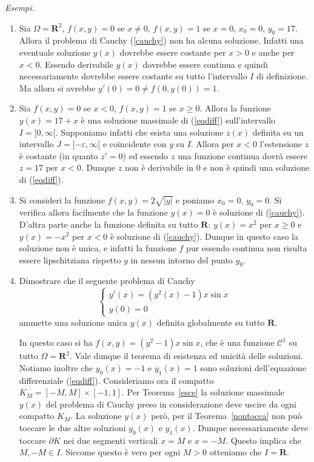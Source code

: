 \documentclass[italian,a4paper]{article}
\newcommand{\R}{\mathbf{R}}
\newcommand{\CC}{\mathcal{C}}
\renewcommand{\epsilon}{\varepsilon}
\begin{document}
\medskip\noindent
\emph{Esempi.}
\begin{enumerate}
\item
Sia $\Omega=\R^2$, $f(x,y)=0$ se $x\neq 0$, $f(x,y)=1$ se $x=0$,
$x_0=0$, $y_0=17$. Allora
il problema di
Cauchy (\ref{cauchy}) non ha alcuna soluzione. Infatti
una eventuale soluzione $y(x)$ dovrebbe essere costante per $x>0$ e
anche per $x<0$. Essendo derivabile $y(x)$ dovrebbe essere continua e
quindi necessariamente dovrebbe essere costante su tutto l'intervallo $I$ di
definizione.  Ma allora si avrebbe $y'(0)=0 \neq f(0,y(0))=1$.

\item
Sia $f(x,y)=0$ se $x<0$, $f(x,y)=1$ se $x\ge 0$.
Allora la funzione
$y(x)=17+x$ \`e una soluzione massimale di (\ref{eqdiff})
sull'intervallo $I=[0,\infty[$. Supponiamo infatti che esista una
soluzione $z(x)$ definita su un intervallo $J=[-\epsilon,\infty[$ e
coincidente con $y$ su $I$. Allora per $x<0$ l'estensione $z$ \`e
costante (in quanto $z'=0$) ed essendo $z$ una funzione continua
dovr\`a essere $z=17$ per $x<0$. Dunque $z$ non \`e derivabile in $0$
e non \`e quindi una soluzione di (\ref{eqdiff}).

\item
Si consideri la funzione $f(x,y)=2\sqrt{\vert y\vert}$ e poniamo
$x_0=0$, $y_0=0$. Si verifica allora
facilmente che la funzione $y(x)=0$ \`e soluzione di
(\ref{cauchy}). D'altra parte anche la funzione definita su tutto
$\R$: $y(x)=x^2$ per $x\ge
0$ e $y(x)=-x^2$ per $x<0$ \`e soluzione di (\ref{cauchy}). Dunque in
questo caso la soluzione non \`e unica, e infatti la funzione $f$ pur
essendo continua non risulta essere lipschitziana rispetto $y$ 
in nessun intorno del punto $y_0$.

\item
Dimostrare che il seguente problema di Cauchy
\[
	\left\{ \begin{array}{l}
		y'(x) = (y^2(x)-1) x\sin x \\
		y(0) = 0
	\end{array}\right.
\]
ammette una soluzione unica $y(x)$ definita globalmente su tutto $\R$.

In questo caso si ha $f(x,y)=(y^2-1)x\sin x$, che \`e una funzione
$\CC^1$ su tutto $\Omega=\R^2$. Vale dunque il teorema di esistenza ed
unicit\`a delle soluzioni. Notiamo inoltre che $y_0(x)=-1$ e $y_1(x)=1$ sono
soluzioni dell'equazione differenziale (\ref{eqdiff}). 
Consideriamo ora il compatto
$K_M=[-M,M] \times [-1,1]$. Per Teorema~\ref{esce} la soluzione
massimale $y(x)$ del problema di Cauchy preso in considerazione deve
uscire da ogni compatto $K_M$. La soluzione $y(x)$ per\`o, per il Teorema~\ref{nontocca} non pu\`o toccare
le due altre soluzioni $y_0(x)$ e $y_1(x)$. Dunque necessariamente
deve toccare $\partial K$ nei due segmenti verticali $x=M$ e
$x=-M$. Questo implica che $M,-M\in I$. Siccome questo \`e vero per
ogni $M>0$ otteniamo che $I=\R$.
\end{enumerate}
\end{document}
